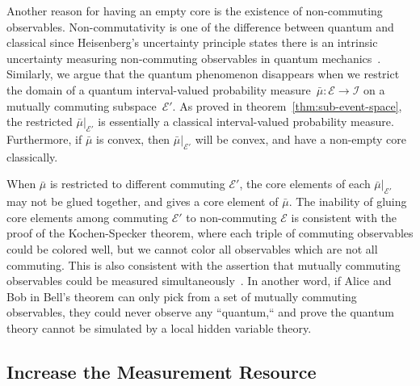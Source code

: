 \documentclass[12pt]{iopart}
\theoremstyle{plain}
\theoremstyle{definition}
\newcommand{\events}{\ensuremath{\mathcal{E}}}
\begin{document}
Another reason for having an empty core is the existence of non-commuting
observables. Non-commutativity is one of the difference between quantum
and classical since Heisenberg's uncertainty principle states there
is an intrinsic uncertainty measuring non-commuting observables in
quantum mechanics~\cite{Heisenberg1983,peres1995quantum,544199,Griffiths2003,Jaeger2007}.
Similarly, we argue that the quantum phenomenon disappears when we
restrict the domain of a quantum interval-valued probability measure~$\bar{\mu}:\events\rightarrow\mathscr{I}$
on a mutually commuting subspace~$\events'$. As proved in theorem~\ref{thm:sub-event-space},
the restricted $\bar{\mu}|_{\events'}$ is essentially a classical
interval-valued probability measure. Furthermore, if $\bar{\mu}$
is convex, then $\bar{\mu}|_{\events'}$ will be convex, and have
a non-empty core classically. 

When $\bar{\mu}$ is restricted to different commuting $\events'$,
the core elements of each $\bar{\mu}|_{\events'}$ may not be glued
together, and gives a core element of $\bar{\mu}$. The inability
of gluing core elements among commuting $\events'$ to non-commuting
$\events$ is consistent with the proof of the Kochen-Specker theorem,
where each triple of commuting observables could be colored well,
but we cannot color all observables which are not all commuting. This
is also consistent with the assertion that mutually commuting observables
could be measured simultaneously~\cite{Mermin_1993}. In another
word, if Alice and Bob in Bell's theorem can only pick from a set
of mutually commuting observables, they could never observe any ``quantum,``
and prove the quantum theory cannot be simulated by a local hidden
variable theory.

\subsection{Increase the Measurement Resource}
\end{document}
